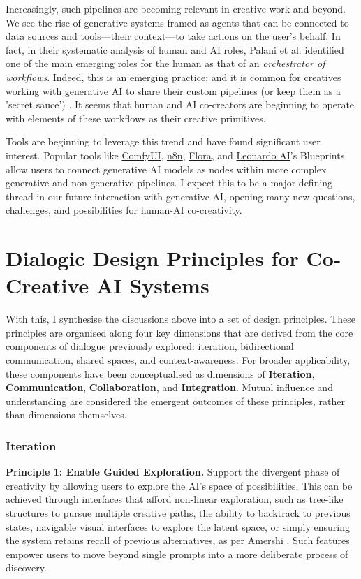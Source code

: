 Increasingly, such pipelines are becoming relevant in creative work and beyond. We see the rise of generative systems framed as agents that can be connected to data sources and tools—their context—to take actions on the user's behalf. In fact, in their systematic analysis of human and AI roles, Palani et al. \cite{Palani2024-on} identified one of the main emerging roles for the human as that of an \textit{orchestrator of workflows}. Indeed, this is an emerging practice; and it is common for creatives working with generative AI to share their custom pipelines (or keep them as a 'secret sauce') \cite{Vox2023-ab}. It seems that human and AI co-creators are beginning to operate with elements of these workflows as their creative primitives.

Tools are beginning to leverage this trend and have found significant user interest. Popular tools like \href{https://github.com/comfyanonymous/ComfyUI}{ComfyUI}, \href{https://n8n.io/}{n8n}, \href{https://flora.app/}{Flora}, and \href{https://leonardo.ai/}{Leonardo AI}'s Blueprints allow users to connect generative AI models as nodes within more complex generative and non-generative pipelines. I expect this to be a major defining thread in our future interaction with generative AI, opening many new questions, challenges, and possibilities for human-AI co-creativity.



\section{Dialogic Design Principles for Co-Creative AI Systems}

With this, I synthesise the discussions above into a set of design principles. These principles are organised along four key dimensions that are derived from the core components of dialogue previously explored: iteration, bidirectional communication, shared spaces, and context-awareness. For broader applicability, these components have been conceptualised as dimensions of \textbf{Iteration}, \textbf{Communication}, \textbf{Collaboration}, and \textbf{Integration}. Mutual influence and understanding are considered the emergent outcomes of these principles, rather than dimensions themselves.

\subsubsection{Iteration}

\textbf{Principle 1: Enable Guided Exploration.} Support the divergent phase of creativity by allowing users to explore the AI's space of possibilities. This can be achieved through interfaces that afford non-linear exploration, such as tree-like structures to pursue multiple creative paths, the ability to backtrack to previous states, navigable visual interfaces to explore the latent space, or simply ensuring the system retains recall of previous alternatives, as per Amershi \cite{Amershi2019-wu}. Such features empower users to move beyond single prompts into a more deliberate process of discovery.

